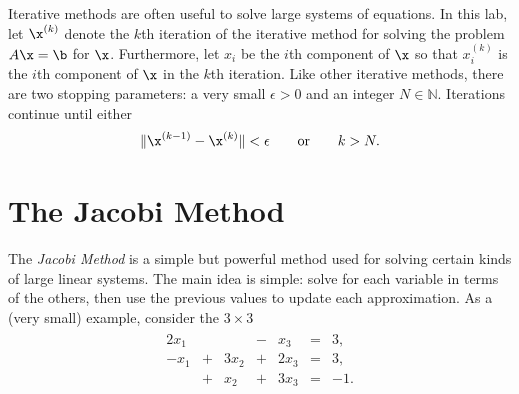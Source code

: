 \label{lab:iter_methods}



Iterative methods are often useful to solve large systems of equations.
In this lab, let $\x^{(k)}$ denote the $k$th iteration of the iterative method for solving the problem $A\x=\b$ for $\x$.
Furthermore, let $x_{i}$ be the $i$th component of $\x$ so that $x_{i}^{(k)}$ is the $i$th component of $\x$ in the $k$th iteration.
Like other iterative methods, there are two stopping parameters: a very small $\epsilon > 0$ and an integer $N\in\mathbb{N}$.
Iterations continue until either
\begin{equation} %
\|\x^{(k-1)}-\x^{(k)}\| < \epsilon
\qquad \text{or} \qquad
k > N.
\label{eq:itersolve-stopping-criteria}
\end{equation}

\section*{The Jacobi Method} %

The \emph{Jacobi Method} is a simple but powerful method used for solving certain kinds of large linear systems.
The main idea is simple: solve for each variable in terms of the others, then use the previous values to update each approximation.
As a (very small) example, consider the $3 \times 3$
\begin{align*}
\begin{array}{ccccccr}
  2x_1 &   &      & - & x_3  & = & 3,  \\
  -x_1 & + & 3x_2 & + & 2x_3 & = & 3,  \\
       & + & x_2  & + & 3x_3 & = & -1. \\
\end{array}
\end{align*}

